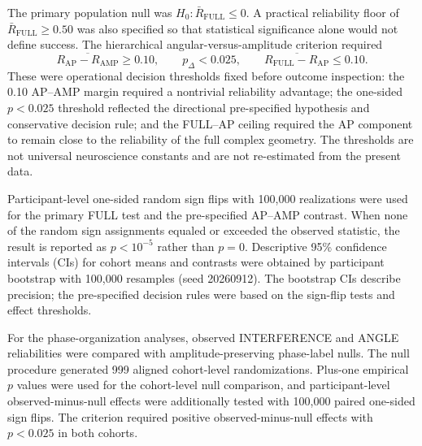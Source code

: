 \documentclass[11pt]{article}
\begin{document}
The primary population null was $H_0:\bar R_{\mathrm{FULL}}\le0$. A practical reliability floor of $\bar R_{\mathrm{FULL}}\ge0.50$ was also specified so that statistical significance alone would not define success. The hierarchical angular-versus-amplitude criterion required
\begin{equation}
\overline{R_{\mathrm{AP}}-R_{\mathrm{AMP}}}\ge0.10,
\qquad p_{\Delta}<0.025,
\qquad
\overline{R_{\mathrm{FULL}}-R_{\mathrm{AP}}}\le0.10.
\label{eq:criterion}
\end{equation}
These were operational decision thresholds fixed before outcome inspection: the 0.10 AP--AMP margin required a nontrivial reliability advantage; the one-sided $p<0.025$ threshold reflected the directional pre-specified hypothesis and conservative decision rule; and the FULL--AP ceiling required the AP component to remain close to the reliability of the full complex geometry. The thresholds are not universal neuroscience constants and are not re-estimated from the present data.

Participant-level one-sided random sign flips with 100,000 realizations were used for the primary FULL test and the pre-specified AP--AMP contrast. When none of the random sign assignments equaled or exceeded the observed statistic, the result is reported as $p<10^{-5}$ rather than $p=0$. Descriptive 95\% confidence intervals (CIs) for cohort means and contrasts were obtained by participant bootstrap with 100,000 resamples (seed 20260912). The bootstrap CIs describe precision; the pre-specified decision rules were based on the sign-flip tests and effect thresholds.

For the phase-organization analyses, observed INTERFERENCE and ANGLE reliabilities were compared with amplitude-preserving phase-label nulls. The null procedure generated 999 aligned cohort-level randomizations. Plus-one empirical $p$ values were used for the cohort-level null comparison, and participant-level observed-minus-null effects were additionally tested with 100,000 paired one-sided sign flips. The criterion required positive observed-minus-null effects with $p<0.025$ in both cohorts.
\end{document}
